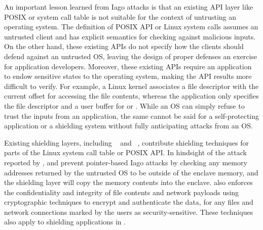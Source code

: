 An important lesson learned from Iago attacks
is that 
an existing API layer like POSIX or system call table is not suitable for the context of untrusting an operating system.
The definition of POSIX API or Linux system calls assumes an untrusted client
and has explicit semantics for checking against malicious inputs.
On the other hand,
these existing APIs do not specify
how the clients should defend against an untrusted OS,
leaving the design of proper defenses
an exercise for application developers.
Moreover,
these existing APIs require an application
to endow sensitive states
to the operating system, making the API results more difficult to verify. For example,
a Linux kernel associates a file descriptor
with the current offset for accessing the file contents, whereas the application
only specifies the file descriptor and a user buffer for  or .
While an OS can simply refuse to trust the inputs from an application,
the same cannot be said for a self-protecting application or a shielding system
without fully anticipating
attacks from an OS.










Existing shielding layers, including \scone{}~\cite{osdi16scone} and \panoply{}~\cite{shinde17panoply},
contribute shielding techniques for parts of the Linux system call table
or POSIX API.
In hindsight of the  attack reported by \citet{checkoway13iago},
\scone{} and \panoply{} prevent
pointer-based Iago attacks by checking any memory addresses returned by the untrusted OS to be outside of the enclave memory,
and the shielding layer will copy the memory contents into the enclave.
\scone{} also
enforces the confidentiality and integrity
of file contents and network payloads
using cryptographic techniques to encrypt and authenticate the data,
for any files and network connections
marked by the users as security-sensitive. 
These techniques also apply to shielding applications in \graphenesgx{}.



